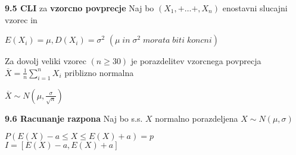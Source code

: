 \documentclass{article}
\begin{document}
\begin{multicols}{2}
	\textbf{9.5 CLI} za \textbf{vzorcno povprecje}
	Naj bo  $(X_1, + \dots +, X_n)$ enostavni slucajni vzorec in
	\begin{center}
		\begin{math}
			E(X_i) = \mu, D(X_i) = \sigma^2
		\end{math}
		\begin{math}
			(\mu\; in\; \sigma^2\; morata\; biti\; koncni)
		\end{math}
	\end{center}
	Za dovolj veliki vzorec $(n \geq 30)$ je porazdelitev vzorcnega povprecja
	$\overline{X} = \frac{1}{n} \sum_{i = 1}^{n} X_i$ priblizno normalna
	\begin{center}
		\begin{math}
			\overline{X} \sim N(\mu, \frac{\sigma}{\sqrt{n}})
		\end{math}
	\end{center}

	\textbf{9.6 Racunanje razpona}
	Naj bo s.s. $X$ normalno porazdeljena $X \sim N(\mu, \sigma)$
	\begin{center}
		\begin{math}
			P(E(X) - a \leq X \leq E(X) + a) = p
		\end{math}\\
		\begin{math}
			I = [E(X) -a, E(X) + a]
		\end{math}
	\end{center}

	\bigskip
\end{multicols}
\end{document}
